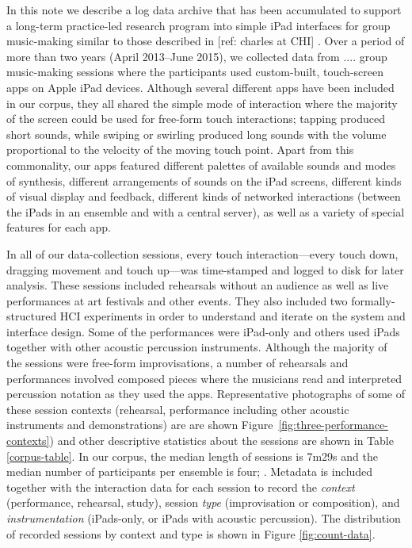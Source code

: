 \documentclass{sigchi}
\begin{document}
In this note we describe a log data archive that has been accumulated
to support a long-term practice-led research program into simple iPad
interfaces for group music-making similar to those described in [ref:
charles at CHI] . Over a period of more than two years (April
2013--June 2015), we collected data from $....$ group music-making
sessions where the participants used custom-built, touch-screen apps
on Apple iPad devices. Although several different apps have been
included in our corpus,
they all shared the simple mode of interaction where the majority of
the screen could be used for free-form touch interactions; tapping
produced short sounds, while swiping or swirling produced long sounds
with the volume proportional to the velocity of the moving touch
point. Apart from this commonality, our apps featured different
palettes of available sounds and modes of synthesis, different
arrangements of sounds on the iPad screens, different kinds of visual
display and feedback, different kinds of networked interactions
(between the iPads in an ensemble and with a central server), as well
as a variety of special features for each app.

In all of our data-collection sessions, every touch
interaction---every touch down, dragging movement and touch up---was
time-stamped and logged to disk for later analysis. These sessions
included rehearsals without an audience as well as live performances
at art festivals and other events. They also included two
formally-structured HCI experiments in order to understand and iterate
on the system and interface design. Some of the performances were
iPad-only and others used iPads together with other acoustic
percussion instruments. Although the majority of the sessions were
free-form improvisations, a number of rehearsals and performances
involved composed pieces where the musicians read and interpreted
percussion notation as they used the apps. Representative photographs
of some of these session contexts (rehearsal, performance including
other acoustic instruments and demonstrations) are are shown
Figure~\ref{fig:three-performance-contexts}) and other descriptive
statistics about the sessions are shown in Table \ref{corpus-table}.
In our corpus, the median length of sessions is 7m29s and the median
number of participants per ensemble is four; . Metadata is included
together with the interaction data for each session to record the
\emph{context} (performance, rehearsal, study), session \emph{type}
(improvisation or composition), and \emph{instrumentation}
(iPads-only, or iPads with acoustic percussion). The distribution of
recorded sessions by context and type is shown in Figure
\ref{fig:count-data}.
\end{document}
